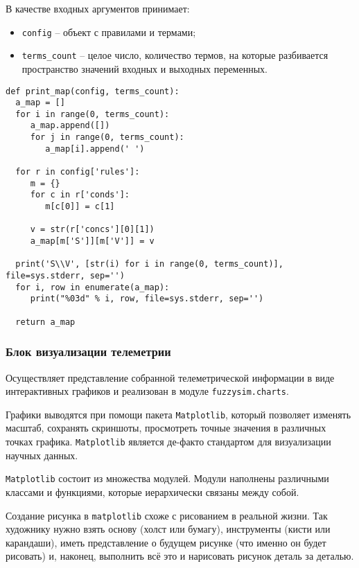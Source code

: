 В качестве входных аргументов принимает:
\begin{itemize}
	\item \lstinline!config! – объект с правилами и термами;
	\item \lstinline!terms_count! – целое число, количество термов, на которые разбивается пространство значений входных и выходных переменных.
\end{itemize}

\begin{lstlisting}[style=pythonstyle,caption={  }, label=lst:func:1]
def print_map(config, terms_count):
  a_map = []
  for i in range(0, terms_count):
     a_map.append([])
     for j in range(0, terms_count):
        a_map[i].append(' ')

  for r in config['rules']:
     m = {}
     for c in r['conds']:
        m[c[0]] = c[1]
        
     v = str(r['concs'][0][1])
     a_map[m['S']][m['V']] = v

  print('S\\V', [str(i) for i in range(0, terms_count)], file=sys.stderr, sep='')
  for i, row in enumerate(a_map):
     print("%03d" % i, row, file=sys.stderr, sep='')

  return a_map
\end{lstlisting}%
\subsubsection{ Блок визуализации телеметрии}


Осуществляет представление собранной телеметрической информации в виде интерактивных графиков и реализован в модуле \lstinline!fuzzysim.charts!.

Графики выводятся при помощи пакета \lstinline!Matplotlib!, который позволяет изменять масштаб, сохранять скриншоты, просмотреть точные значения в различных точках графика.  \lstinline!Matplotlib! является де-факто стандартом для визуализации научных данных.

\lstinline!Matplotlib! состоит из множества модулей. Модули наполнены различными классами и функциями, которые иерархически связаны между собой.

Создание рисунка в \lstinline!matplotlib! схоже с рисованием в реальной жизни. Так художнику нужно взять основу (холст или бумагу), инструменты (кисти или карандаши), иметь представление о будущем рисунке (что именно он будет рисовать) и, наконец, выполнить всё это и нарисовать рисунок деталь за деталью.

